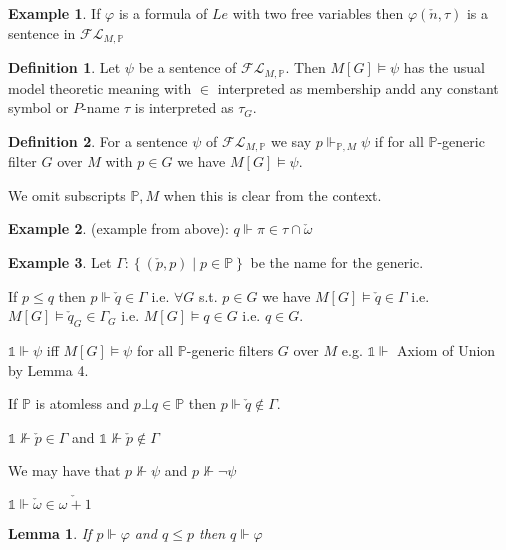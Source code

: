 \documentclass{scrartcl}
\newcommand{\set}[1]{\left\{#1\right\}}
\theoremstyle{definition}
\newtheorem*{definition*}{Definition}
\newtheorem*{example*}{Example}
\theoremstyle{plain}
\newtheorem*{lemma*}{Lemma}
\theoremstyle{remark}
\begin{document}
	\begin{example*}
		If $\varphi$ is a formula of $Le$ with two free variables then $\varphi(\check{n}, \tau)$ is a sentence in $\mathcal{FL}_{M, \mathbb{P}}$
	\end{example*}

	\begin{definition*}
		Let $\psi$ be a sentence of $\mathcal{FL}_{M, \mathbb{P}}$. Then $M[G] \vDash \psi$ has the usual model theoretic meaning 
		with $\in$ interpreted as membership andd any constant symbol or $P$-name $\tau$ is interpreted as $\tau_G$. 
	\end{definition*}

	\begin{definition*}
		For a sentence $\psi$ of $\mathcal{FL}_{M, \mathbb{P}}$ we say $p \Vdash_{\mathbb{P}, M} \psi$ if for all $\mathbb{P}$-generic
		filter $G$ over $M$ with $p \in G$ we have $M[G] \vDash \psi$.

		We omit subscripts $\mathbb{P}, M$ when this is clear from the context.
	\end{definition*}

	\begin{example*}
		(example from above): $q \Vdash \pi \in \tau \cap \check{\omega}$
	\end{example*}

	\begin{example*}
		Let $\Gamma : \set{(\check{p}, p) \mid p \in \mathbb{P}}$ be the name for the generic.

		If $p \leq q$ then $p \Vdash \check{q} \in \Gamma$ i.e. $\forall G$ s.t. $p \in G$ we have 
		$M[G] \vDash \check {q} \in \Gamma$ i.e. $M[G] \vDash \check{q}_G \in \Gamma_G$
		i.e. $M[G] \vDash q \in G$ i.e. $q \in G$.

		$\mathbb{1} \Vdash \psi$ iff $M[G] \vDash \psi$ for all $\mathbb{P}$-generic filters $G$ over $M$ e.g.
		$\mathbb{1} \Vdash $ Axiom of Union by Lemma 4.

		If $\mathbb{P}$ is atomless and $p \bot q \in \mathbb{P}$ then $p \Vdash \check{q} \notin \Gamma$.

		$\mathbb{1} \nVdash  \check{p} \in \Gamma $ and  $\mathbb{1} \nVdash  \check{p} \notin \Gamma$

		We may have that $p \nVdash \psi$ and $p \nVdash \lnot \psi$

		$\mathbb{1} \Vdash \check{\omega} \in \check{\omega + 1}$
	\end{example*}

	\begin{lemma*}
		If $p \Vdash \varphi$ and $q \leq p$ then $q \Vdash \varphi$		
	\end{lemma*}
\end{document}

